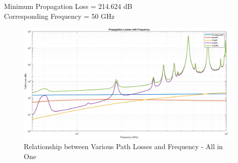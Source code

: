 \documentclass[a4paper,11pt]{article}%
\begin{document}
Minimum Propagation Loss = 214.624 dB\\
Corresponding Frequency = 50 GHz\\



\begin{figure}[!h]
	\centering
	\includegraphics[scale=0.35]{figures/AllinOne.png}
	\caption{Relationship between Various Path Losses and Frequency - All in One}
\end{figure}
%
%
%
\end{document}
